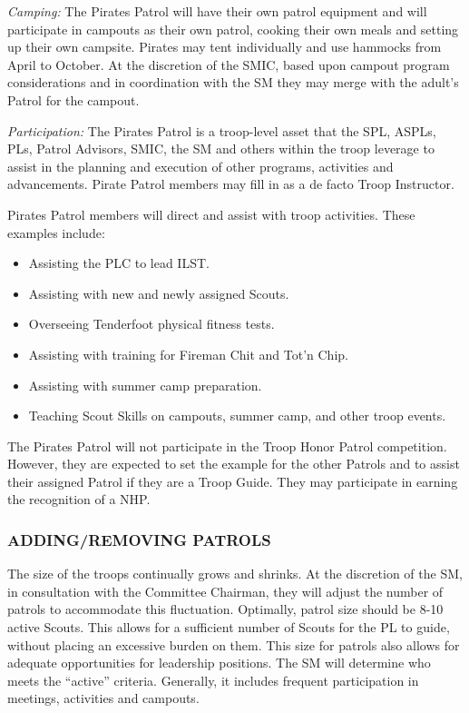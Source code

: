 \documentclass{ltxguide}
\begin{document}
\textit{Camping:} 
The Pirates Patrol will have their own patrol equipment and will participate in campouts as their own patrol, cooking their own meals and setting up their own campsite. Pirates may tent individually and use hammocks from April to October. At the discretion of the SMIC, based upon campout program considerations and in coordination with the \ac{SM} they may merge with the adult's Patrol for the campout.

\textit{Participation:}
The Pirates Patrol is a troop-level asset that the \ac{SPL}, \acp{ASPL}, \acp{PL}, Patrol Advisors, SMIC, the \ac{SM} and others within the troop leverage to assist in the planning and execution of other programs, activities and advancements. Pirate Patrol members may fill in as a de facto Troop Instructor.

Pirates Patrol members will direct and assist with troop activities. These examples include:
\begin{itemize}
	\item Assisting the \ac{PLC} to lead ILST.
	\item Assisting with new and newly assigned Scouts.
	\item Overseeing Tenderfoot physical fitness tests.
	\item Assisting with training for Fireman Chit and Tot'n Chip.
	\item Assisting with summer camp preparation.
	\item Teaching Scout Skills on campouts, summer camp, and other troop events.
\end{itemize}

The Pirates Patrol will not participate in the Troop Honor Patrol competition. However, they are expected to set the example for the other Patrols and to assist their assigned Patrol if they are a Troop Guide. They may participate in earning the recognition of a \ac{NHP}.

\subsubsection{ADDING/REMOVING PATROLS}
The size of the troops continually grows and shrinks. At the discretion of the SM, in consultation with the Committee Chairman, they will adjust the number of patrols to accommodate this fluctuation. Optimally, patrol size should be 8-10 active Scouts. This allows for a sufficient number of Scouts for the \ac{PL} to guide, without placing an excessive burden on them. This size for patrols also allows for adequate opportunities for leadership positions. The \ac{SM} will determine who meets the “active” criteria. Generally, it includes frequent participation in meetings, activities and campouts.
\end{document}
